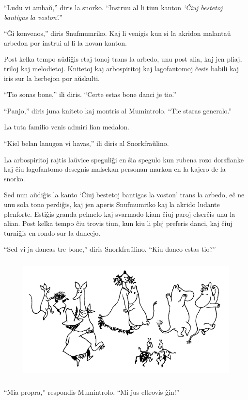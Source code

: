 ``Ludu vi ambaŭ,'' diris la snorko. ``Instruu al li tiun kanton \emph{`Ĉiuj bestetoj bantigas la voston'.}''

``Ĝi konvenos,'' diris Snufmumriko. Kaj li venigis kun si la akridon malantaŭ arbedon por instrui al li la novan kanton.

Post kelka tempo aŭdiĝis etaj tonoj trans la arbedo, unu post alia, kaj jen pliaj, triloj kaj melodietoj. Knitetoj kaj arbospiritoj kaj lagofantomoj ĉesis babili kaj iris sur la herbejon por aŭskulti.

``Tio sonas bone,'' ili diris. ``Certe estas bone danci je tio.''

``Panjo,'' diris juna kniteto kaj montris al Mumintrolo. ``Tie staras generalo.''

La tuta familio venis admiri lian medalon.

``Kiel belan lanugon vi havas,'' ili diris al Snorkfraŭlino.

La arbospiritoj rajtis laŭvice speguliĝi en ŝia spegulo kun rubena rozo dorsflanke kaj ĉiu lagofantomo desegnis malsekan personan markon en la kajero de la snorko.

Sed nun aŭdiĝis la kanto `Ĉiuj bestetoj bantigas la voston' trans la arbedo, eĉ ne unu sola tono perdiĝis, kaj jen aperis Snufmumriko kaj la akrido ludante plenforte. Estiĝis granda pelmelo kaj svarmado kiam ĉiuj paroj elserĉis unu la alian. Post kelka tempo ĉiu trovis tiun, kun kiu li plej preferis danci, kaj ĉiuj turniĝis en rondo sur la dancejo.

``Sed vi ja dancas tre bone,'' diris Snorkfraŭlino. ``Kiu danco estas tio?''

\begin{figure}[htbp]
\centering
\includegraphics[width=350pt,height=182pt]{6-7.png}
\caption{}
\label{6-7}
\end{figure}

``Mia propra,'' respondis Mumintrolo. ``Mi ĵus eltrovis ĝin!''


